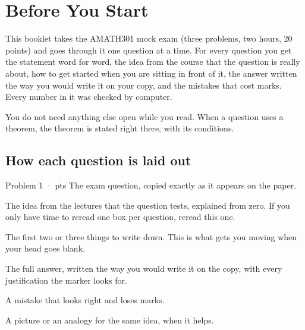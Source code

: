 \chapter{Before You Start}

This booklet takes the AMATH301 mock exam (three problems, two hours, 20 points) and goes through
it one question at a time. For every question you get the statement word for word, the idea from
the course that the question is really about, how to get started when you are sitting in front of
it, the answer written the way you would write it on your copy, and the mistakes that cost marks.
Every number in it was checked by computer.

You do not need anything else open while you read. When a question uses a theorem, the theorem is
stated right there, with its conditions.

\section{How each question is laid out}

{\renewcommand{\thequ}{\unskip}
\begin{question}{Problem 1 \;· pts}
The exam question, copied exactly as it appears on the paper.
\end{question}}\setcounter{qu}{0}

\begin{lesson}
The idea from the lectures that the question tests, explained from zero. If you only have time
to reread one box per question, reread this one.
\end{lesson}

\begin{howto}
The first two or three things to write down. This is what gets you moving when your head goes blank.
\end{howto}

\begin{answer}
The full answer, written the way you would write it on the copy, with every justification the
marker looks for.
\end{answer}

\begin{trap}
A mistake that looks right and loses marks.
\end{trap}

\begin{intuition}
A picture or an analogy for the same idea, when it helps.
\end{intuition}


